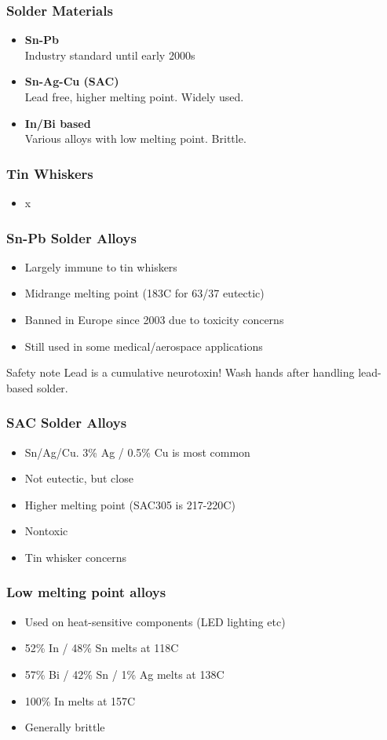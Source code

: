 \documentclass{beamer}
\begin{document}
\begin{frame}
\frametitle{Solder Materials}
\begin{itemize}
\item \textbf{Sn-Pb} \\
Industry standard until early 2000s
\item \textbf{Sn-Ag-Cu (SAC)} \\
Lead free, higher melting point. Widely used.
\item \textbf{In/Bi based} \\
Various alloys with low melting point. Brittle.
\end{itemize}
\end{frame}

\begin{frame}
\frametitle{Tin Whiskers}
\begin{itemize}
\item x
\end{itemize}
\end{frame}

\begin{frame}
\frametitle{Sn-Pb Solder Alloys}
\begin{itemize}
\item Largely immune to tin whiskers
\item Midrange melting point (183C for 63/37 eutectic)
\item Banned in Europe since 2003 due to toxicity concerns
\item Still used in some medical/aerospace applications
\end{itemize}
\begin{alertblock}{Safety note}
Lead is a cumulative neurotoxin! Wash hands after handling lead-based solder.
\end{alertblock}
\end{frame}

\begin{frame}
\frametitle{SAC Solder Alloys}
\begin{itemize}
\item Sn/Ag/Cu. 3\% Ag / 0.5\% Cu is most common
\item Not eutectic, but close
\item Higher melting point (SAC305 is 217-220C)
\item Nontoxic
\item Tin whisker concerns
\end{itemize}
\end{frame}

\begin{frame}
\frametitle{Low melting point alloys}
\begin{itemize}
\item Used on heat-sensitive components (LED lighting etc)
\item 52\% In / 48\% Sn melts at 118C
\item 57\% Bi / 42\% Sn / 1\% Ag melts at 138C
\item 100\% In melts at 157C
\item Generally brittle
\end{itemize}
\end{frame}
\end{document}
